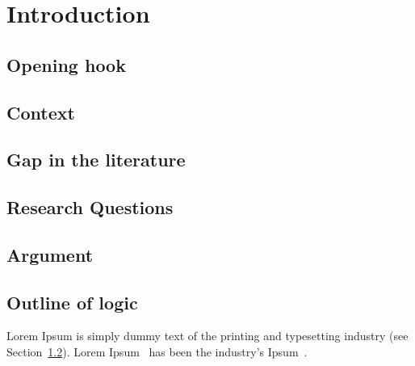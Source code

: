 
\chapter{Introduction}  %

\ifpdf
    \graphicspath{{chapter1/figs/raster/}{chapter1/figs/PDF/}{chapter1/figs/}}
\else
    \graphicspath{{chapter1/figs/vector/}{chapter1/figs/}}
\fi


\section{Opening hook}

\section{Context} %
\label{section1.1}

\section{Gap in the literature}
\section{Research Questions}
\section{Argument}

\section{Outline of logic}
Lorem Ipsum is simply dummy text of the printing and typesetting industry (see
Section~\ref{section1.1}). Lorem Ipsum~\citep{Aup91} has been the industry's
Ipsum~\citep{AAB95,Con90,LM65}.
